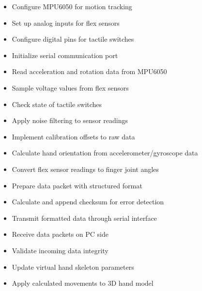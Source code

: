 \begin{itemize}
    \item Configure MPU6050 for motion tracking
    \item Set up analog inputs for flex sensors
    \item Configure digital pins for tactile switches
    \item Initialize serial communication port
    \item Read acceleration and rotation data from MPU6050
    \item Sample voltage values from flex sensors
    \item Check state of tactile switches
    \item Apply noise filtering to sensor readings
    \item Implement calibration offsets to raw data
    \item Calculate hand orientation from accelerometer/gyroscope data
    \item Convert flex sensor readings to finger joint angles
    \item Prepare data packet with structured format
    \item Calculate and append checksum for error detection
    \item Transmit formatted data through serial interface
    \item Receive data packets on PC side
    \item Validate incoming data integrity
    \item Update virtual hand skeleton parameters
    \item Apply calculated movements to 3D hand model
\end{itemize}

